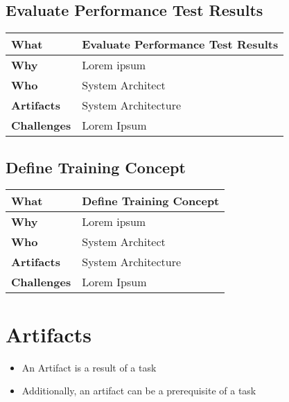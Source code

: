 \subsection{Evaluate Performance Test Results}
\begin{minipage}{\textwidth}
 \label{table:ch6_Evaluate_Performance_Results}
\begin{tabular}
	{|m{3cm}|m{10cm}|} \hline \bfseries What & Evaluate Performance Test Results\\
	\hline \bfseries Why & Lorem ipsum\\
	\hline \bfseries Who & System Architect\\
	\hline \bfseries Artifacts & System Architecture\\
	\hline \bfseries Challenges & Lorem Ipsum\\
	\hline 
\end{tabular}
\end{minipage}

\subsection{Define Training Concept}
\begin{minipage}{\textwidth}
 \label{table:ch6_Task_Define_Training_Concept}
\begin{tabular}
	{|m{3cm}|m{10cm}|} \hline \bfseries What & Define Training Concept\\
	\hline \bfseries Why & Lorem ipsum\\
	\hline \bfseries Who & System Architect\\
	\hline \bfseries Artifacts & System Architecture\\
	\hline \bfseries Challenges & Lorem Ipsum\\
	\hline 
\end{tabular}
\end{minipage}

\section{Artifacts}

\begin{itemize}
	\item An Artifact is a result of a task
	\item Additionally, an artifact can be a prerequisite of a task
\end{itemize}

